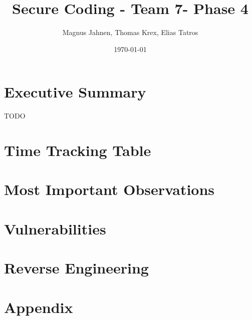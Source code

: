\documentclass{report}
\title{Secure Coding - Team 7- Phase 4}
\author{Magnus Jahnen, Thomas Krex, Elias Tatros}
\date{\today}
\begin{document}
\maketitle

\part{Executive Summary}
TODO


\tableofcontents

\part{Time Tracking Table}


\part{Most Important Observations}


\part{Vulnerabilities}



\part{Reverse Engineering}



\part*{Appendix}
\appendix

\end{document}
